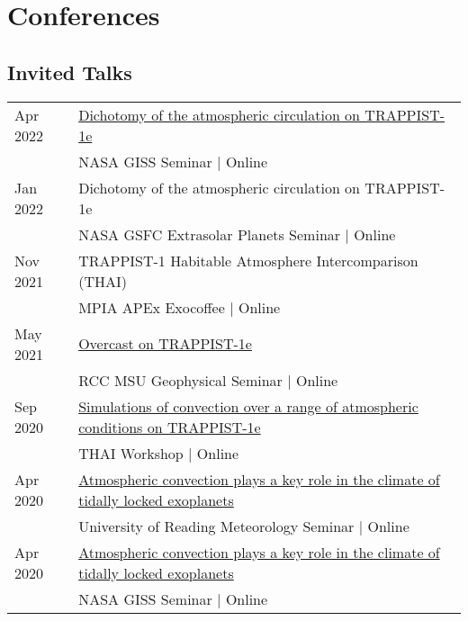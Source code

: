 \documentclass[a4paper, 11pt]{article}
\begin{document}
\section{Conferences}
\subsection*{Invited Talks}
\begin{tabularx}{\linewidth}{@{}l X@{}}
Apr 2022 & \href{https://youtu.be/0uDBIp_EQrg}{Dichotomy of the atmospheric circulation on TRAPPIST-1e} \\ & NASA GISS Seminar | Online \\
Jan 2022 & Dichotomy of the atmospheric circulation on TRAPPIST-1e \\ & NASA GSFC Extrasolar Planets Seminar | Online \\
Nov 2021 & TRAPPIST-1 Habitable Atmosphere Intercomparison (THAI) \\ & MPIA APEx Exocoffee | Online \\
May 2021 & \href{https://youtu.be/ZUfIK-HMgLw}{Overcast on TRAPPIST-1e} \\ & RCC MSU Geophysical Seminar | Online \\
Sep 2020 & \href{https://youtu.be/E4UAoCoI1x8}{Simulations of convection over a range of atmospheric conditions on TRAPPIST-1e} \\ & THAI Workshop | Online \\
Apr 2020 & \href{https://slides.com/denissergeev/2020-04-27-uor-met}{Atmospheric convection plays a key role in the climate of tidally locked exoplanets} \\ & University of Reading Meteorology Seminar | Online \\
Apr 2020 & \href{https://slides.com/denissergeev/2020-04-21-nasa-giss}{Atmospheric convection plays a key role in the climate of tidally locked exoplanets} \\ & NASA GISS Seminar | Online \\
\end{tabularx}
\vspace{1ex}
\end{document}
